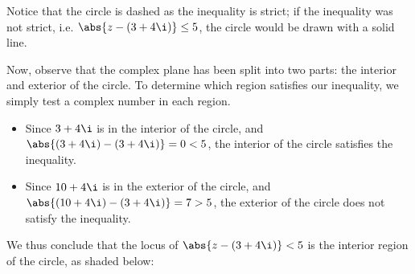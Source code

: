 Notice that the circle is dashed as the inequality is strict; if the inequality was not strict, i.e. $\abs{z - (3 + 4\i)} \leq 5$, the circle would be drawn with a solid line.

Now, observe that the complex plane has been split into two parts: the interior and exterior of the circle. To determine which region satisfies our inequality, we simply test a complex number in each region.
\begin{itemize}
    \item Since $3 + 4\i$ is in the interior of the circle, and $\abs{(3 + 4\i) - (3 + 4\i)} = 0 < 5$, the interior of the circle satisfies the inequality.
    \item Since $10 + 4\i$ is in the exterior of the circle, and $\abs{(10 + 4\i) - (3 + 4\i)} = 7 > 5$, the exterior of the circle does not satisfy the inequality.
\end{itemize}

We thus conclude that the locus of $\abs{z - (3 + 4\i)} < 5$ is the interior region of the circle, as shaded below:

\begin{center}
\end{center}

